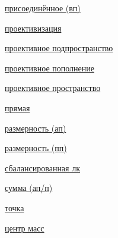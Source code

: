 \documentclass[a4paper,100pt]{article}
\theoremstyle{indented}
\theoremstyle{definition}
\theoremstyle{remark}
\begin{document}
\begin{multicols}{2}
    \hyperlink{s3}{присоединённое (вп)} \ 
    
    \hyperlink{s33}{проективизация} \ 
    
    \hyperlink{s35}{проективное подпространство} \ 
    
    \hyperlink{s37}{проективное пополнение} \ 
    
    \hyperlink{s32}{проективное пространство} \ 
    
    \hyperlink{s18}{прямая} \ 
    
    \hyperlink{s15}{размерность (ап)} \ 
    
    \hyperlink{s34}{размерность (пп)} \ 
    
    \hyperlink{s9}{сбалансированная лк} \ 
    
    \hyperlink{s20}{сумма (ап/п)} \ 
    
    \hyperlink{s2}{точка} \ 
    
    \hyperlink{s12}{центр масс} \ 

\end{multicols}
\end{document}

